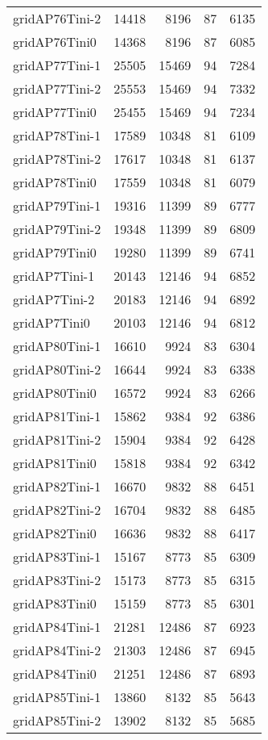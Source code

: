 \begin{longtable}{lrrrr}
gridAP76Tini-2 & 14418 & 8196 & 87 & 6135 \\
gridAP76Tini0 & 14368 & 8196 & 87 & 6085 \\
gridAP77Tini-1 & 25505 & 15469 & 94 & 7284 \\
gridAP77Tini-2 & 25553 & 15469 & 94 & 7332 \\
gridAP77Tini0 & 25455 & 15469 & 94 & 7234 \\
gridAP78Tini-1 & 17589 & 10348 & 81 & 6109 \\
gridAP78Tini-2 & 17617 & 10348 & 81 & 6137 \\
gridAP78Tini0 & 17559 & 10348 & 81 & 6079 \\
gridAP79Tini-1 & 19316 & 11399 & 89 & 6777 \\
gridAP79Tini-2 & 19348 & 11399 & 89 & 6809 \\
gridAP79Tini0 & 19280 & 11399 & 89 & 6741 \\
gridAP7Tini-1 & 20143 & 12146 & 94 & 6852 \\
gridAP7Tini-2 & 20183 & 12146 & 94 & 6892 \\
gridAP7Tini0 & 20103 & 12146 & 94 & 6812 \\
gridAP80Tini-1 & 16610 & 9924 & 83 & 6304 \\
gridAP80Tini-2 & 16644 & 9924 & 83 & 6338 \\
gridAP80Tini0 & 16572 & 9924 & 83 & 6266 \\
gridAP81Tini-1 & 15862 & 9384 & 92 & 6386 \\
gridAP81Tini-2 & 15904 & 9384 & 92 & 6428 \\
gridAP81Tini0 & 15818 & 9384 & 92 & 6342 \\
gridAP82Tini-1 & 16670 & 9832 & 88 & 6451 \\
gridAP82Tini-2 & 16704 & 9832 & 88 & 6485 \\
gridAP82Tini0 & 16636 & 9832 & 88 & 6417 \\
gridAP83Tini-1 & 15167 & 8773 & 85 & 6309 \\
gridAP83Tini-2 & 15173 & 8773 & 85 & 6315 \\
gridAP83Tini0 & 15159 & 8773 & 85 & 6301 \\
gridAP84Tini-1 & 21281 & 12486 & 87 & 6923 \\
gridAP84Tini-2 & 21303 & 12486 & 87 & 6945 \\
gridAP84Tini0 & 21251 & 12486 & 87 & 6893 \\
gridAP85Tini-1 & 13860 & 8132 & 85 & 5643 \\
gridAP85Tini-2 & 13902 & 8132 & 85 & 5685 \\

\end{longtable}
